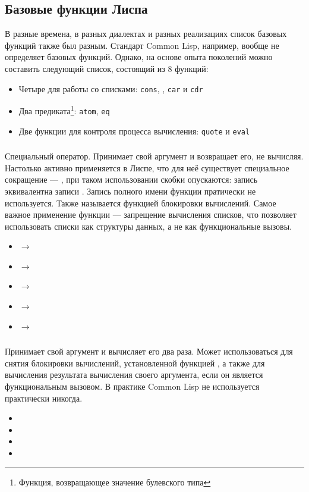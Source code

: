 \documentclass[a4paper, 12pt, titlepage, twoside]{article}
\newenvironment{examples}
               {\begin{itemize}\renewcommand{\labelitemi}{ }}
               {\end{itemize}}
\begin{document}
\subsection{Базовые функции Лиспа}
В разные времена, в разных диалектах и разных реализациях список базовых функций также был разным. Стандарт Common Lisp, например, вообще не определяет базовых функций. Однако, на основе опыта поколений можно составить следующий список, состоящий из 8 функций:
\begin{itemize}
\item[] Четыре для работы со списками: \texttt{cons}, , \texttt{car} и \texttt{cdr}
\item[] Два предиката\footnote{Функция, возвращающее значение булевского типа}: \texttt{atom}, \texttt{eq}
\item[] Две функции для контроля процесса вычисления: \texttt{quote} и \texttt{eval}
\end{itemize}
\subsubsection{}
Специальный оператор. Принимает свой аргумент и возвращает его, не вычисляя. Настолько активно применяется в Лиспе, что для неё существует специальное сокращение --- , при таком использовании скобки опускаются: запись  эквивалентна записи . Запись полного имени функции пратически не используется. Также называется функцией блокировки вычислений. Самое важное применение функции --- запрещение вычисления списков, что позволяет использовать списки как структуры данных, а не как функциональные вызовы.
\begin{examples}
\item {} $\longrightarrow$ 
\item {} $\longrightarrow$ 
\item {} $\longrightarrow$ 
\item {} $\longrightarrow$ 
\item {} $\longrightarrow$ 
\end{examples}
\subsubsection{}
Принимает свой аргумент и вычисляет его два раза. Может использоваться для снятия блокировки вычислений, установленной функцией , а также для вычисления результата вычисления своего аргумента, если он является функциональным вызовом. В практике Common Lisp не используется практически никогда.
\begin{examples}
\item {}
\item {}
\item {}
\item {}
\end{examples}
\end{document}

